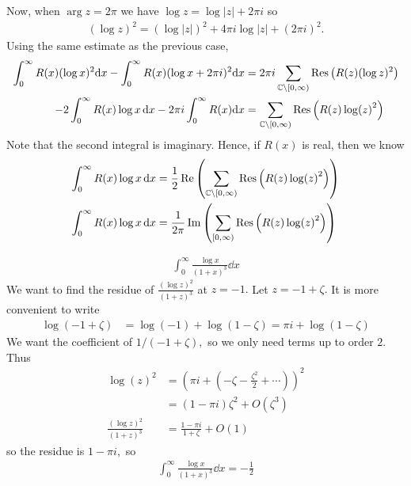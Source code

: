 \documentclass[a4paper,12pt]{article}
\begin{document}
Now, when $\arg z=2\pi$ we have $\log z=\log |z|+2\pi i$ so \begin{align}
    (\log z)^2=(\log |z|)^2+4\pi i\log |z|+(2\pi i)^2.
\end{align} 
Using the same estimate as the previous case, \begin{align}
    \int_0^\infty R(x)(\log x)^2\dd x-\int_0^\infty R(x)(\log x+2\pi i)^2\dd x&=2\pi i\sum_{\mathbb{C}\setminus[0,\infty)}\mathrm{Res}\left(R(z)(\log z)^2\right)\\
    -2\int_{0}^\infty R(x)\log x\,\dd x-2\pi i\int_0^\infty R(x)\dd x&=\sum_{\mathbb{C}\setminus[0,\infty)}\mathrm{Res}\left(R(z)\log(z)^2\right)
\end{align}
Note that the second integral is imaginary. Hence, if $R(x)$ is real, then we know \begin{align}
    \int_0^\infty R(x)\log x\,\dd x&=\frac{1}{2}\Re\left(\sum_{\mathbb{C}\setminus[0,\infty)}\mathrm{Res}\left(R(z)\log(z)^2\right)\right)\\
    \int_0^\infty R(x)\log x\,\dd x&=\frac{1}{2\pi}\Im\left(\sum_{[0,\infty)}\mathrm{Res}\left(R(z)\log(z)^2\right)\right)
\end{align}
\begin{example}
    \begin{align}
        \int_0^\infty\frac{\log x}{(1+x)^3}\dd x
    \end{align}
    We want to find the residue of $\frac{(\log z)^2}{(1+z)^3}$ at $z=-1.$ Let $z=-1+\zeta.$ It is more convenient to write \begin{align}
        \log(-1+\zeta)&=\log(-1)+\log(1-\zeta)=\pi i+\log(1-\zeta)
    \end{align}
    We want the coefficient of $1/(-1+\zeta),$ so we only need terms up to order $2.$ Thus \begin{align}
        \log(z)^2&=\left(\pi i+\left(-\zeta-\frac{\zeta^2}{2}+\cdots\right)\right)^2\\
        &=(1-\pi i)\zeta^2+O(\zeta^3)\\
        \frac{(\log z)^2}{(1+z)^3}&=\frac{1-\pi i}{1+\zeta}+O(1)
    \end{align}
    so the residue is $1-\pi i,$ so \begin{align}
        \int_0^\infty\frac{\log x}{(1+x)^3}\dd x=-\frac{1}{2}
    \end{align}
\end{example}
\end{document}
